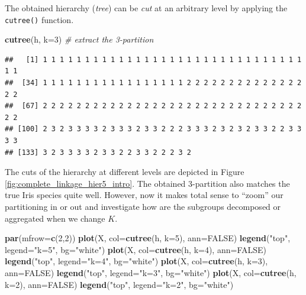 \documentclass[10pt,b5paper,krantz1]{krantz}
\newenvironment{Shaded}{\begin{snugshade}}{\end{snugshade}}
\newcommand{\CommentTok}[1]{\textcolor[rgb]{0.37,0.37,0.37}{\textit{#1}}}
\newcommand{\DataTypeTok}[1]{\textcolor[rgb]{0.27,0.27,0.27}{#1}}
\newcommand{\DecValTok}[1]{\textcolor[rgb]{0.06,0.06,0.06}{#1}}
\newcommand{\KeywordTok}[1]{\textcolor[rgb]{0.27,0.27,0.27}{\textbf{#1}}}
\newcommand{\NormalTok}[1]{#1}
\newcommand{\OtherTok}[1]{\textcolor[rgb]{0.37,0.37,0.37}{#1}}
\newcommand{\StringTok}[1]{\textcolor[rgb]{0.5,0.5,0.5}{#1}}
\begin{document}
The obtained hierarchy (\emph{tree}) can be \emph{cut} at an arbitrary level
by applying the \texttt{cutree()} function.

\begin{Shaded}
\begin{Highlighting}[]
\KeywordTok{cutree}\NormalTok{(h, }\DataTypeTok{k=}\DecValTok{3}\NormalTok{) }\CommentTok{# extract the 3-partition}
\end{Highlighting}
\end{Shaded}

\begin{verbatim}
##   [1] 1 1 1 1 1 1 1 1 1 1 1 1 1 1 1 1 1 1 1 1 1 1 1 1 1 1 1 1 1 1 1 1 1
##  [34] 1 1 1 1 1 1 1 1 1 1 1 1 1 1 1 1 1 2 2 2 2 2 2 2 2 2 2 2 2 2 2 2 2
##  [67] 2 2 2 2 2 2 2 2 2 2 2 2 2 2 2 2 2 2 2 2 2 2 2 2 2 2 2 2 2 2 2 2 2
## [100] 2 3 2 3 3 3 3 2 3 3 3 2 3 3 2 2 2 3 3 3 2 3 2 3 2 3 3 2 2 3 3 3 3
## [133] 3 2 3 3 3 3 2 3 3 2 2 3 3 2 2 2 3 2
\end{verbatim}

The cuts of the hierarchy at different levels
are depicted in Figure \ref{fig:complete_linkage_hier5_intro}.
The obtained 3-partition also matches the true Iris species quite well.
However, now it makes total sense to ``zoom'' our partitioning in or out
and investigate how are the subgroups decomposed or aggregated when we change
\(K\).

\begin{Shaded}
\begin{Highlighting}[]
\KeywordTok{par}\NormalTok{(}\DataTypeTok{mfrow=}\KeywordTok{c}\NormalTok{(}\DecValTok{2}\NormalTok{,}\DecValTok{2}\NormalTok{))}
\KeywordTok{plot}\NormalTok{(X, }\DataTypeTok{col=}\KeywordTok{cutree}\NormalTok{(h, }\DataTypeTok{k=}\DecValTok{5}\NormalTok{), }\DataTypeTok{ann=}\OtherTok{FALSE}\NormalTok{)}
\KeywordTok{legend}\NormalTok{(}\StringTok{"top"}\NormalTok{, }\DataTypeTok{legend=}\StringTok{"k=5"}\NormalTok{, }\DataTypeTok{bg=}\StringTok{"white"}\NormalTok{)}
\KeywordTok{plot}\NormalTok{(X, }\DataTypeTok{col=}\KeywordTok{cutree}\NormalTok{(h, }\DataTypeTok{k=}\DecValTok{4}\NormalTok{), }\DataTypeTok{ann=}\OtherTok{FALSE}\NormalTok{)}
\KeywordTok{legend}\NormalTok{(}\StringTok{"top"}\NormalTok{, }\DataTypeTok{legend=}\StringTok{"k=4"}\NormalTok{, }\DataTypeTok{bg=}\StringTok{"white"}\NormalTok{)}
\KeywordTok{plot}\NormalTok{(X, }\DataTypeTok{col=}\KeywordTok{cutree}\NormalTok{(h, }\DataTypeTok{k=}\DecValTok{3}\NormalTok{), }\DataTypeTok{ann=}\OtherTok{FALSE}\NormalTok{)}
\KeywordTok{legend}\NormalTok{(}\StringTok{"top"}\NormalTok{, }\DataTypeTok{legend=}\StringTok{"k=3"}\NormalTok{, }\DataTypeTok{bg=}\StringTok{"white"}\NormalTok{)}
\KeywordTok{plot}\NormalTok{(X, }\DataTypeTok{col=}\KeywordTok{cutree}\NormalTok{(h, }\DataTypeTok{k=}\DecValTok{2}\NormalTok{), }\DataTypeTok{ann=}\OtherTok{FALSE}\NormalTok{)}
\KeywordTok{legend}\NormalTok{(}\StringTok{"top"}\NormalTok{, }\DataTypeTok{legend=}\StringTok{"k=2"}\NormalTok{, }\DataTypeTok{bg=}\StringTok{"white"}\NormalTok{)}
\end{Highlighting}
\end{Shaded}
\end{document}
